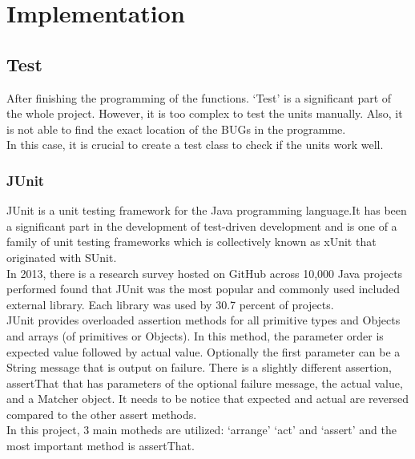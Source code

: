 \documentclass[a4paper,12pt]{article}
\begin{document}
\section{Implementation}
\subsection{Test}
After finishing the programming of the functions. ‘Test’ is a significant part of the whole project. However, it is too complex to test the units manually. Also, it is not able to find the exact location of the BUGs in the programme.\\
In this case, it is crucial to create a test class to check if the units work well.\\
\subsubsection{JUnit}
JUnit is a unit testing framework for the Java programming language.It has been a significant part in the development of test-driven development and is one of a family of unit testing frameworks which is collectively known as xUnit that originated with SUnit.\\
In 2013, there is a research survey hosted on GitHub across 10,000 Java projects performed found that JUnit was the most popular and commonly used  included external library. Each library was used by 30.7 percent of projects.\\
JUnit provides overloaded assertion methods for all primitive types and Objects and arrays (of primitives or Objects). In this method, the parameter order is expected value followed by actual value. Optionally the first parameter can be a String message that is output on failure. There is a slightly different assertion, assertThat that has parameters of the optional failure message, the actual value, and a Matcher object. It needs to be notice that expected and actual are reversed compared to the other assert methods.\\
In this project, 3 main motheds are utilized: ‘arrange’ ‘act’ and ‘assert’ and the most important method is assertThat.\\
\end{document}
